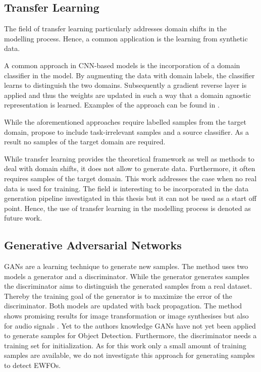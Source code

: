 \subsection{Transfer Learning}

The field of transfer learning particularly addresses domain shifts in the modelling process. Hence, a common application is the learning from synthetic data.

A common approach in \ac{CNN}-based models is the incorporation of a domain classifier in the model. By augmenting the data with domain labels, the classifier learns to distinguish the two domains. Subsequently a gradient reverse layer is applied and thus the weights are updated in such a way that a domain agnostic representation is learned. Examples of the approach can be found in \cite{Chen2018c, Xu2017}.

While the aforementioned approaches require labelled samples from the target domain, \citeauthor{Peng2017} \cite{Peng2017} propose to include task-irrelevant samples and a source classifier. As a result no samples of the target domain are required.

While transfer learning provides the theoretical framework as well as methods to deal with domain shifts, it does not allow to generate data. Furthermore, it often requires samples of the target domain. This work addresses the case when no real data is used for training. The field is interesting to be incorporated in the data generation pipeline investigated in this thesis but it can not be used as a start off point. Hence, the use of transfer learning in the modelling process is denoted as future work.

\subsection{Generative Adversarial Networks}

\acp{GAN} \cite{Goodfellow2014} are a learning technique to generate new samples. The method uses two models a generator and a discriminator. While the generator generates samples the discriminator aims to distinguish the generated samples from a real dataset. Thereby the training goal of the generator is to maximize the error of the discriminator. Both models are updated with back propagation. The method shows promising results for image transformation or image synthesises but also for audio signals \cite{Creswell2017}. Yet to the authors knowledge \acp{GAN} have not yet been applied to generate samples for Object Detection. Furthermore, the discriminator needs a training set for initialization. As for this work only a small amount of training samples are available, we do not investigate this approach for generating samples to detect \acp{EWFO}.

